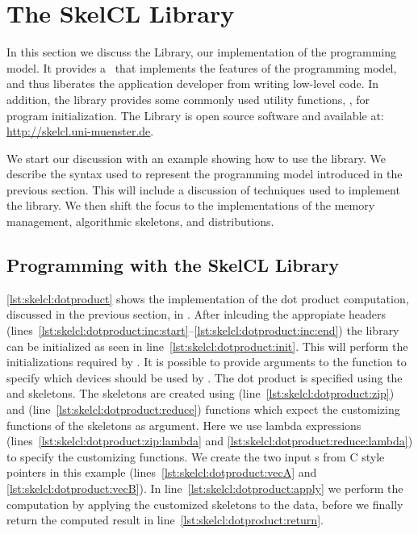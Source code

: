\section{The SkelCL Library}
\label{section:skelcl-library}
In this section we discuss the \SkelCL Library, our implementation of the \SkelCL programming model.
It provides a \Cpp~\API that implements the features of the \SkelCL programming model, and thus liberates the application developer from writing low-level code.
In addition, the library provides some commonly used utility functions, \eg, for program initialization.
The \SkelCL Library is open source software and available at: \url{http://skelcl.uni-muenster.de}.

We start our discussion with an example showing how to use the \SkelCL library.
We describe the syntax used to represent the \SkelCL programming model introduced in the previous section.
This will include a discussion of \Cpp techniques used to implement the library.
We then shift the focus to the implementations of the memory management, algorithmic skeletons, and distributions.

\subsection{Programming with the SkelCL Library}

\autoref{lst:skelcl:dotproduct} shows the implementation of the dot product computation, discussed in the previous section, in \SkelCL.
After inlcuding the appropiate \SkelCL headers (lines~\autoref{lst:skelcl:dotproduct:inc:start}--\autoref{lst:skelcl:dotproduct:inc:end}) the \SkelCL library can be initialized as seen in line~\autoref{lst:skelcl:dotproduct:init}.
This will perform the initializations required by \OpenCL.
It is possible to provide arguments to the  function to specify which \OpenCL devices should be used by \SkelCL.
The dot product is specified using the \zip and \reduce skeletons.
The skeletons are created using  (line~\autoref{lst:skelcl:dotproduct:zip}) and  (line~\autoref{lst:skelcl:dotproduct:reduce}) functions which expect the customizing functions of the skeletons as argument.
Here we use \Cpp lambda expressions (lines~\autoref{lst:skelcl:dotproduct:zip:lambda} and \autoref{lst:skelcl:dotproduct:reduce:lambda}) to specify the customizing functions.
We create the two input s from C style pointers in this example (lines~\autoref{lst:skelcl:dotproduct:vecA} and \autoref{lst:skelcl:dotproduct:vecB}).
In line~\autoref{lst:skelcl:dotproduct:apply} we perform the computation by applying the customized skeletons to the data, before we finally return the computed result in line~\autoref{lst:skelcl:dotproduct:return}.

